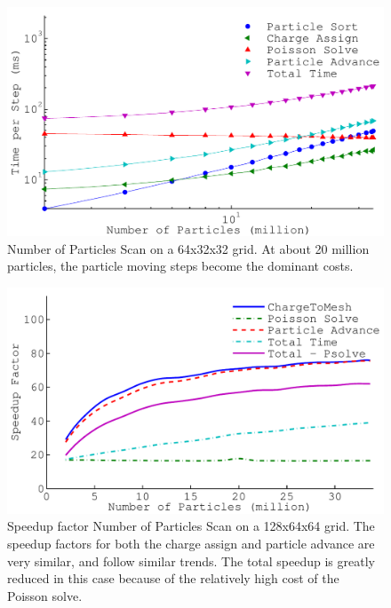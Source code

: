 \begin{figure}
\begin{center}
\includegraphics[width=6in]{performance/nptclsize_scan64x32x32ons8bins.pdf}
\end{center}
\caption[Number of Particles Scan on a 64x32x32 grid]{Number of Particles Scan on a 64x32x32 grid. At about 20 million particles, the particle moving steps become the dominant costs.}
\label{fig:nptclsize_scan64x32x32}
\end{figure}

\begin{figure}
\begin{center}
\includegraphics[width=6in]{performance/nptclspeedup_scan128x64x64ons8bins.pdf}
\end{center}
\caption[Speedup factor Number of Particles Scan on a 128x64x64 grid]{Speedup factor Number of Particles Scan on a 128x64x64 grid. The speedup factors for both the charge assign and particle advance are very similar, and follow similar trends. The total speedup is greatly reduced in this case because of the relatively high cost of the Poisson solve.}
\label{fig:nptclsize_scan_speedup}
\end{figure}

